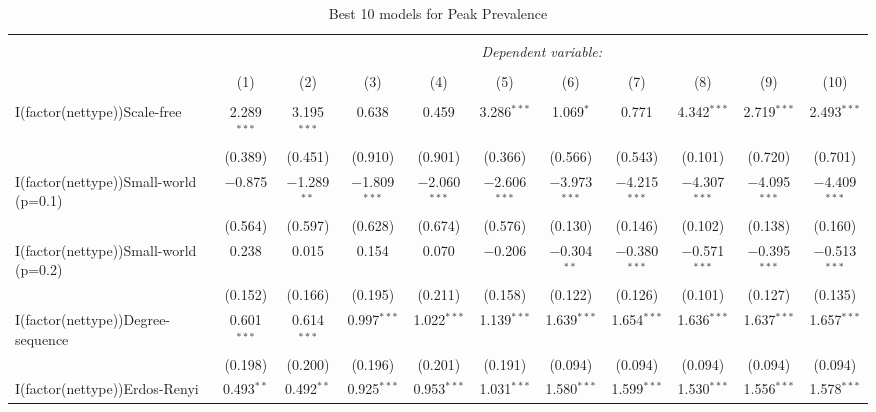
\begin{table}[!htbp] \centering 
  \caption{Best 10 models for Peak Prevalence} 
  \label{tab:best_models_peak_preval} 
\begin{tabular}{@{\extracolsep{5pt}}lcccccccccc} 
\\[-1.8ex]\hline 
\hline \\[-1.8ex] 
 & \multicolumn{10}{c}{\textit{Dependent variable:}} \\ 
\cline{2-11} 
\\[-1.8ex] & (1) & (2) & (3) & (4) & (5) & (6) & (7) & (8) & (9) & (10)\\ 
\hline \\[-1.8ex] 
 I(factor(nettype))Scale-free & 2.289$^{***}$ & 3.195$^{***}$ & 0.638 & 0.459 & 3.286$^{***}$ & 1.069$^{*}$ & 0.771 & 4.342$^{***}$ & 2.719$^{***}$ & 2.493$^{***}$ \\ 
  & (0.389) & (0.451) & (0.910) & (0.901) & (0.366) & (0.566) & (0.543) & (0.101) & (0.720) & (0.701) \\ 
  I(factor(nettype))Small-world (p=0.1) & $-$0.875 & $-$1.289$^{**}$ & $-$1.809$^{***}$ & $-$2.060$^{***}$ & $-$2.606$^{***}$ & $-$3.973$^{***}$ & $-$4.215$^{***}$ & $-$4.307$^{***}$ & $-$4.095$^{***}$ & $-$4.409$^{***}$ \\ 
  & (0.564) & (0.597) & (0.628) & (0.674) & (0.576) & (0.130) & (0.146) & (0.102) & (0.138) & (0.160) \\ 
  I(factor(nettype))Small-world (p=0.2) & 0.238 & 0.015 & 0.154 & 0.070 & $-$0.206 & $-$0.304$^{**}$ & $-$0.380$^{***}$ & $-$0.571$^{***}$ & $-$0.395$^{***}$ & $-$0.513$^{***}$ \\ 
  & (0.152) & (0.166) & (0.195) & (0.211) & (0.158) & (0.122) & (0.126) & (0.101) & (0.127) & (0.135) \\ 
  I(factor(nettype))Degree-sequence & 0.601$^{***}$ & 0.614$^{***}$ & 0.997$^{***}$ & 1.022$^{***}$ & 1.139$^{***}$ & 1.639$^{***}$ & 1.654$^{***}$ & 1.636$^{***}$ & 1.637$^{***}$ & 1.657$^{***}$ \\ 
  & (0.198) & (0.200) & (0.196) & (0.201) & (0.191) & (0.094) & (0.094) & (0.094) & (0.094) & (0.094) \\ 
  I(factor(nettype))Erdos-Renyi & 0.493$^{**}$ & 0.492$^{**}$ & 0.925$^{***}$ & 0.953$^{***}$ & 1.031$^{***}$ & 1.580$^{***}$ & 1.599$^{***}$ & 1.530$^{***}$ & 1.556$^{***}$ & 1.578$^{***}$ \\ 

\end{tabular}
\end{table}

